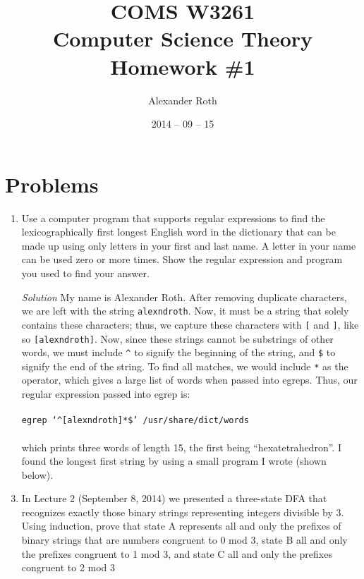 \documentclass[]{article}
\begin{document}
\newtheorem{thm}{Theorem}

\title{COMS W3261 \\ Computer Science Theory \\ Homework \#1}
\author{Alexander Roth}
\date{2014 -- 09 -- 15}
\maketitle

\section*{Problems}
  \begin{enumerate}
    \item Use a computer program that supports regular expressions to find the 
    lexicographically first longest English word in the dictionary that can be
    made up using only letters in your first and last name. A letter in your 
    name can be used zero or more times. Show the regular expression and program
    you used to find your answer.
    \item[\emph{Solution}] My name is Alexander Roth. After removing duplicate
    characters, we are left with the string \texttt{alexndroth}. Now, it must
    be a string that solely contains these characters; thus, we capture these
    characters with \texttt{[} and \texttt{]}, like so \texttt{[alexndroth]}.
    Now, since these strings cannot be substrings of other words, we must 
    include \texttt{\^{}} to signify the beginning of the string, and 
    \texttt{\$} to signify the end of the string. To find all matches, we would 
    include \texttt{*} as the operator, which gives a large list of words when 
    passed into egreps. Thus, our regular expression passed into egrep is: \\\\
      \texttt{egrep `\^{}[alexndroth]*\$' /usr/share/dict/words} \\\\
    which prints three words of length 15, the first being ``hexatetrahedron''. 
    I found the longest first string by using a small program I wrote 
    (shown below).
    
     
    \item In Lecture 2 (September 8, 2014) we presented a three-state DFA that
    recognizes exactly those binary strings representing integers divisible by 
    3. Using induction, prove that state A represents all and only the prefixes 
    of binary strings that are numbers congruent to 0 mod 3, state B all and 
    only the prefixes congruent to 1 mod 3, and state C all and only the 
    prefixes congruent to 2 mod 3


\end{enumerate}
\end{document}
